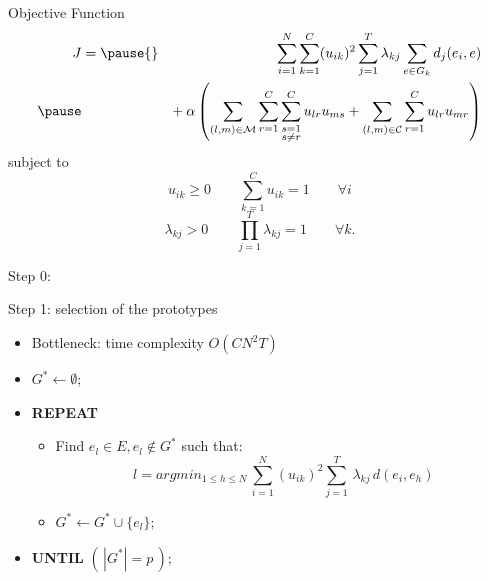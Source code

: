 \documentclass{beamer}
\begin{document}
\begin{frame}{Objective Function}
\begin{eqnarray*}
  J&{}=
  \pause
  {}&\sum_{i=1}^{N}\sum_{k=1}^{C}(u_{ik})^{2}\sum_{j=1}^{T}\lambda_{kj}\sum_{e \in G_{k}}d_{j}(e_{i},e)\\
  \pause
  &&{+}\:\alpha\left (\sum_{(l,m)\in\mathcal{M}}\sum_{r=1}^{C}\sum_{\substack{s=1 \\{s}\neq{r}}}^{C}u_{lr}u_{ms}+\sum_{(l,m)\in\mathcal{C}}\sum_{r=1}^{C}u_{lr}u_{mr}\right )
\end{eqnarray*}
  \pause
subject to
\begin{displaymath}
  u_{ik} \geq 0\qquad\sum_{k=1}^{C}u_{ik} = 1\qquad\forall i
\end{displaymath}
\begin{displaymath}
  \lambda_{kj} > 0\qquad\prod_{j=1}^{T}\lambda_{kj} = 1\qquad\forall k.
\end{displaymath}
\end{frame}

\begin{frame}{Step 0:}
\end{frame}

\begin{frame}{Step 1: selection of the prototypes}
	\begin{itemize}
		\item{Bottleneck: time complexity $O({C}{N^2}{T})$}
	\end{itemize}
	\begin{itemize}
		\item[]$G^{*} \leftarrow \emptyset;$ 
		\item[]\textbf{REPEAT}
			\begin{itemize}
				\item[]Find $e_l \in E, e_l \not\in G^{*}$ such that:
					\begin{displaymath}
							l = argmin_{1 \leq h \leq N} \, \displaystyle \sum_{i=1}^N (u_{ik})^{2} \sum_{j=1}^T \, \lambda_{kj} \, d(e_i,e_h)
					\end{displaymath}
				\item[]$G^{*} \leftarrow  G^{*} \cup \{e_l\};$
			\end{itemize}
		\item[]\textbf{UNTIL} $(\,|G^{*}| = p\,);$
	\end{itemize}
\end{frame}
\end{document}
